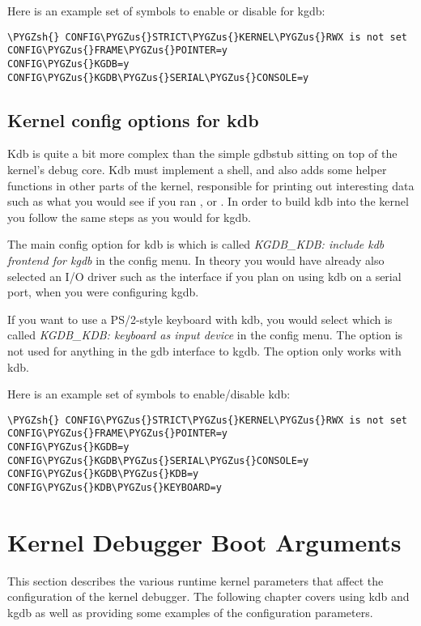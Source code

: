 \documentclass[a4paper,8pt,english]{sphinxmanual}
\def\PYGZus{\char`\_}
\def\PYGZsh{\char`\#}
\begin{document}
Here is an example set of  symbols to enable or disable for kgdb:

\begin{Verbatim}[commandchars=\\\{\}]
\PYGZsh{} CONFIG\PYGZus{}STRICT\PYGZus{}KERNEL\PYGZus{}RWX is not set
CONFIG\PYGZus{}FRAME\PYGZus{}POINTER=y
CONFIG\PYGZus{}KGDB=y
CONFIG\PYGZus{}KGDB\PYGZus{}SERIAL\PYGZus{}CONSOLE=y
\end{Verbatim}


\subsection{Kernel config options for kdb}
\label{dev-tools/kgdb:kernel-config-options-for-kdb}
Kdb is quite a bit more complex than the simple gdbstub sitting on top
of the kernel's debug core. Kdb must implement a shell, and also adds
some helper functions in other parts of the kernel, responsible for
printing out interesting data such as what you would see if you ran
, or . In order to build kdb into the kernel you follow the
same steps as you would for kgdb.

The main config option for kdb is  which is called
\emph{KGDB\_KDB: include kdb frontend for kgdb} in the config menu.
In theory you would have already also selected an I/O driver such as the
 interface if you plan on using kdb on a
serial port, when you were configuring kgdb.

If you want to use a PS/2-style keyboard with kdb, you would select
 which is called \emph{KGDB\_KDB: keyboard as
input device} in the config menu. The  option is not
used for anything in the gdb interface to kgdb. The 
option only works with kdb.

Here is an example set of  symbols to enable/disable kdb:

\begin{Verbatim}[commandchars=\\\{\}]
\PYGZsh{} CONFIG\PYGZus{}STRICT\PYGZus{}KERNEL\PYGZus{}RWX is not set
CONFIG\PYGZus{}FRAME\PYGZus{}POINTER=y
CONFIG\PYGZus{}KGDB=y
CONFIG\PYGZus{}KGDB\PYGZus{}SERIAL\PYGZus{}CONSOLE=y
CONFIG\PYGZus{}KGDB\PYGZus{}KDB=y
CONFIG\PYGZus{}KDB\PYGZus{}KEYBOARD=y
\end{Verbatim}


\section{Kernel Debugger Boot Arguments}
\label{dev-tools/kgdb:kernel-debugger-boot-arguments}
This section describes the various runtime kernel parameters that affect
the configuration of the kernel debugger. The following chapter covers
using kdb and kgdb as well as providing some examples of the
configuration parameters.
\end{document}
